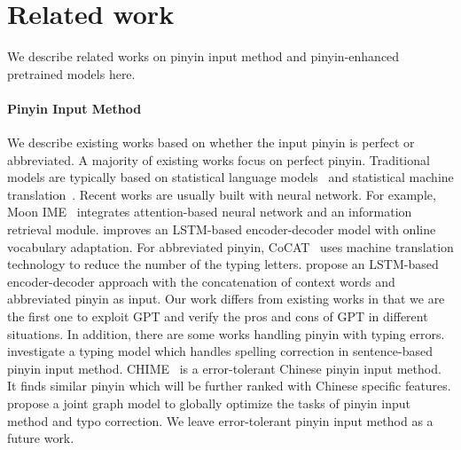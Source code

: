 \section{Related work}

We describe related works on pinyin input method and pinyin-enhanced pretrained  models here.

\paragraph{Pinyin Input Method} We describe existing works based on whether the input pinyin is perfect or abbreviated.
A majority of existing works focus on {perfect} pinyin.
Traditional models are typically based on statistical language models~\cite{chen-lee-2000-new} and statistical machine translation~\cite{yang-etal-2012-towards}.
Recent works are usually built with neural network. For example, Moon IME~\cite{huang-etal-2018-moon} integrates  attention-based neural network and an information retrieval module. 
\citet{zhang-etal-2019-open} improves an LSTM-based encoder-decoder model with online vocabulary adaptation.
For abbreviated pinyin, 
CoCAT~\cite{huang-etal-2015-ijcai-input} uses machine translation technology to reduce the number of the typing letters. 
\citet{huang-zhao-2018-chinese} propose an LSTM-based encoder-decoder approach with the concatenation of context words and abbreviated pinyin as input. Our work differs from existing works in that we are the first one to exploit GPT and verify the pros and cons of GPT in different situations.
In addition, there are some works handling pinyin with typing errors.
\citet{chen-lee-2000-new} investigate a typing model which handles spelling correction in sentence-based pinyin input method.
CHIME~\cite{zheng-etal-ijcai-2011-chime} is a error-tolerant Chinese pinyin input method. It finds similar pinyin which will be further ranked with Chinese specific features.
\citet{jia-zhao-2014-joint} propose a joint graph model to globally optimize the tasks of pinyin input method and typo correction.
We leave error-tolerant pinyin input method as a future work.

